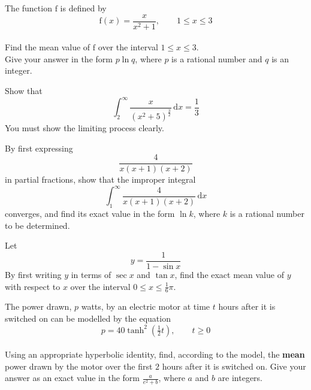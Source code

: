 \documentclass[leqno]{article}
\begin{document}
\djsFrontMatter
\begin{enumerate}[
  label=\textbf{\arabic*.},
  leftmargin=*,
  topsep=0pt,
  partopsep=0pt,
  parsep=0pt
]

\questionitem

The function $\mathrm{f}$ is defined by
\[\mathrm{f}(x) = \dfrac{x}{x^2+1}, \qquad 1 \le x \le 3\] \\
Find the mean value of $\mathrm{f}$ over the interval $1 \le x \le 3$. \\

Give your answer in the form $p\ln q$, where $p$ is a rational number and $q$ is an integer.  \\

\newpage

\questionitem

Show that
\[\int_{2}^{\infty} \dfrac{x}{(x^{2}+5)^{\frac{3}{2}}}\,\mathrm{d}x = \dfrac{1}{3}\]
You must show the limiting process clearly.  \\

\newpage

\questionitem

By first expressing
\[\dfrac{4}{x(x+1)(x+2)}\]
in partial fractions, show that the improper integral
\[\int_1^{\infty} \dfrac{4}{x(x+1)(x+2)}\,\mathrm{d}x\]
converges, and find its exact value in the form $\ln k$, where $k$ is a rational number to be determined.  \\

\newpage

\questionitem

Let
\[y = \dfrac{1}{1 - \sin x}\]
By first writing $y$ in terms of $\sec x$ and $\tan x$, find the exact mean value of $y$ with respect to $x$ over the interval $0 \le x \le \frac{1}{6}\pi$.  \\

\newpage

\questionitem

The power drawn, $p$ watts, by an electric motor at time $t$ hours after it is switched on can be modelled by the equation
\[p = 40\tanh^2\left(\tfrac{1}{2}t\right), \qquad t \ge 0\] \\
Using an appropriate hyperbolic identity, find, according to the model, the \textbf{mean} power drawn by the motor over the first $2$ hours after it is switched on. Give your answer as an exact value in the form $\frac{a}{e^2+b}$, where $a$ and $b$ are integers.  \\


\end{enumerate}
\end{document}
